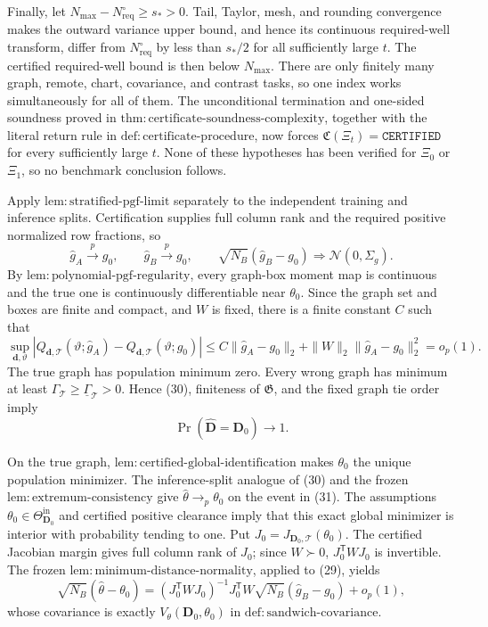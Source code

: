 Finally, let \(N_{\max}-N_{\mathrm{req}}^\circ\geq s_*>0\).  Tail, Taylor, mesh, and rounding convergence makes the outward variance upper bound, and hence its continuous required-well transform, differ from \(N_{\mathrm{req}}^\circ\) by less than \(s_*/2\) for all sufficiently large \(t\).  The certified required-well bound is then below \(N_{\max}\).  There are only finitely many graph, remote, chart, covariance, and contrast tasks, so one index works simultaneously for all of them.  The unconditional termination and one-sided soundness proved in \(\mathrm{thm{:}certificate\text{-}soundness\text{-}complexity}\), together with the literal return rule in \(\mathrm{def{:}certificate\text{-}procedure}\), now forces \(\mathfrak C(\Xi_t)=\mathtt{CERTIFIED}\) for every sufficiently large \(t\).  None of these hypotheses has been verified for \(\Xi_0\) or \(\Xi_1\), so no benchmark conclusion follows.

Apply \(\mathrm{lem{:}stratified\text{-}pgf\text{-}limit}\) separately to the independent training and inference splits.  Certification supplies full column rank and the required positive normalized row fractions, so
\[
 \widehat g_A\overset p\longrightarrow g_0,
 \qquad
 \widehat g_B\overset p\longrightarrow g_0,
 \qquad
 \sqrt{N_B}(\widehat g_B-g_0)
 \Rightarrow\mathcal N(0,\Sigma_g). \tag{29}
\]
By \(\mathrm{lem{:}polynomial\text{-}pgf\text{-}regularity}\), every graph-box moment map is continuous and the true one is continuously differentiable near \(\theta_0\).  Since the graph set and boxes are finite and compact, and \(W\) is fixed, there is a finite constant \(C\) such that
\[
 \sup_{\boldsymbol d,\vartheta}
 \left|Q_{\boldsymbol d,\mathcal T}(\vartheta;\widehat g_A)
 -Q_{\boldsymbol d,\mathcal T}(\vartheta;g_0)\right|
 \leq C\|\widehat g_A-g_0\|_2+
 \|W\|_2\|\widehat g_A-g_0\|_2^2=o_p(1). \tag{30}
\]
The true graph has population minimum zero.  Every wrong graph has minimum at least
\(\Gamma_{\mathcal T}\geq\underline\Gamma_{\mathcal T}>0\).  Hence (30), finiteness of \(\mathfrak G\), and the fixed graph tie order imply
\[
 \Pr(\widehat{\boldsymbol D}=\boldsymbol D_0)\longrightarrow1. \tag{31}
\]

On the true graph, \(\mathrm{lem{:}certified\text{-}global\text{-}identification}\) makes \(\theta_0\) the unique population minimizer.  The inference-split analogue of (30) and the frozen \(\mathrm{lem{:}extremum\text{-}consistency}\) give \(\widehat\theta\to_p\theta_0\) on the event in (31).  The assumptions \(\theta_0\in\Theta^{\mathrm{in}}_{\boldsymbol D_0}\) and certified positive clearance imply that this exact global minimizer is interior with probability tending to one.  Put
\(J_0=J_{\boldsymbol D_0,\mathcal T}(\theta_0)\).  The certified Jacobian margin gives full column rank of \(J_0\); since \(W\succ0\), \(J_0^{\mathsf T}WJ_0\) is invertible.  The frozen \(\mathrm{lem{:}minimum\text{-}distance\text{-}normality}\), applied to (29), yields
\[
 \sqrt{N_B}(\widehat\theta-\theta_0)
 =(J_0^{\mathsf T}WJ_0)^{-1}J_0^{\mathsf T}W
 \sqrt{N_B}(\widehat g_B-g_0)+o_p(1), \tag{32}
\]
whose covariance is exactly \(V_\theta(\boldsymbol D_0,\theta_0)\) in \(\mathrm{def{:}sandwich\text{-}covariance}\).

